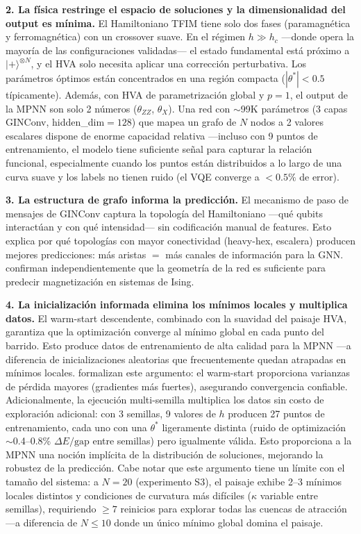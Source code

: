 \documentclass[11pt,a4paper,spanish]{book}
\begin{document}
\textbf{2. La física restringe el espacio de soluciones y la dimensionalidad del output es mínima.} El Hamiltoniano TFIM tiene solo dos fases (paramagnética y ferromagnética) con un crossover suave. En el régimen $h \gg h_c$ ---donde opera la mayoría de las configuraciones validadas--- el estado fundamental está próximo a $|+\rangle^{\otimes N}$, y el HVA solo necesita aplicar una corrección perturbativa. Los parámetros óptimos están concentrados en una región compacta ($|\theta^*| < 0.5$ típicamente). Además, con HVA de parametrización global y $p = 1$, el output de la MPNN son solo 2 números ($\theta_{ZZ}$, $\theta_X$). Una red con $\sim$99K parámetros (3 capas GINConv, hidden\_dim$=128$) que mapea un grafo de $N$ nodos a 2 valores escalares dispone de enorme capacidad relativa ---incluso con 9 puntos de entrenamiento, el modelo tiene suficiente señal para capturar la relación funcional, especialmente cuando los puntos están distribuidos a lo largo de una curva suave y los labels no tienen ruido (el VQE converge a $< 0.5\%$ de error).

\textbf{3. La estructura de grafo informa la predicción.} El mecanismo de paso de mensajes de GINConv captura la topología del Hamiltoniano ---qué qubits interactúan y con qué intensidad--- sin codificación manual de features. Esto explica por qué topologías con mayor conectividad (heavy-hex, escalera) producen mejores predicciones: más aristas $=$ más canales de información para la GNN. \citet{slavin2025} confirman independientemente que la geometría de la red es suficiente para predecir magnetización en sistemas de Ising.

\textbf{4. La inicialización informada elimina los mínimos locales y multiplica datos.} El warm-start descendente, combinado con la suavidad del paisaje HVA, garantiza que la optimización converge al mínimo global en cada punto del barrido. Esto produce datos de entrenamiento de alta calidad para la MPNN ---a diferencia de inicializaciones aleatorias que frecuentemente quedan atrapadas en mínimos locales. \citet{puig2025} formalizan este argumento: el warm-start proporciona varianzas de pérdida mayores (gradientes más fuertes), asegurando convergencia confiable. Adicionalmente, la ejecución multi-semilla multiplica los datos sin costo de exploración adicional: con 3 semillas, 9 valores de $h$ producen 27 puntos de entrenamiento, cada uno con una $\theta^*$ ligeramente distinta (ruido de optimización $\sim$0.4--0.8\% $\Delta E/\text{gap}$ entre semillas) pero igualmente válida. Esto proporciona a la MPNN una noción implícita de la distribución de soluciones, mejorando la robustez de la predicción. Cabe notar que este argumento tiene un límite con el tamaño del sistema: a $N = 20$ (experimento S3), el paisaje exhibe 2--3 mínimos locales distintos y condiciones de curvatura más difíciles ($\kappa$ variable entre semillas), requiriendo $\geq 7$ reinicios para explorar todas las cuencas de atracción ---a diferencia de $N \leq 10$ donde un único mínimo global domina el paisaje.
\end{document}
